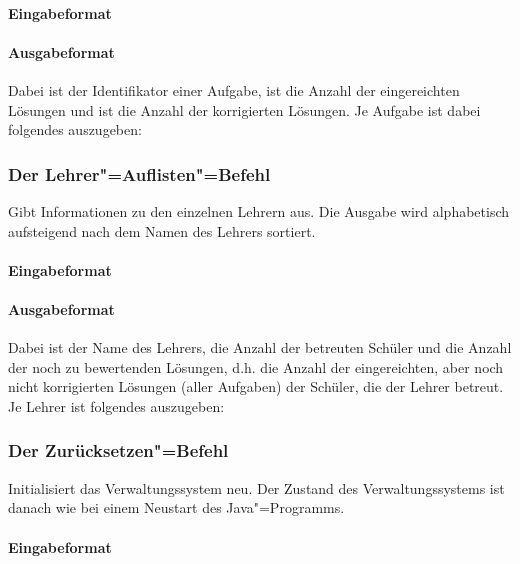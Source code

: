 \documentclass{sdqassignment}
\begin{document}
\paragraph{Eingabeformat}
\paragraph{Ausgabeformat}
Dabei ist  der Identifikator einer Aufgabe,  ist die Anzahl der eingereichten Lösungen und  ist die Anzahl der korrigierten Lösungen. Je Aufgabe ist dabei folgendes auszugeben:


\subsubsection{Der Lehrer"=Auflisten"=Befehl}
Gibt Informationen zu den einzelnen Lehrern aus. Die Ausgabe wird alphabetisch aufsteigend nach dem Namen des Lehrers sortiert.
\paragraph{Eingabeformat}
\paragraph{Ausgabeformat}
Dabei ist  der Name des Lehrers,  die Anzahl der betreuten Schüler und  die Anzahl der noch zu bewertenden Lösungen, d.h. die Anzahl der eingereichten, aber noch nicht korrigierten Lösungen (aller Aufgaben) der Schüler, die der Lehrer betreut. Je Lehrer ist folgendes auszugeben:


\subsubsection{Der Zurücksetzen"=Befehl}
Initialisiert das Verwaltungssystem neu. Der Zustand des Verwaltungssystems ist danach wie bei einem Neustart des Java"=Programms.
\paragraph{Eingabeformat}
\end{document}
